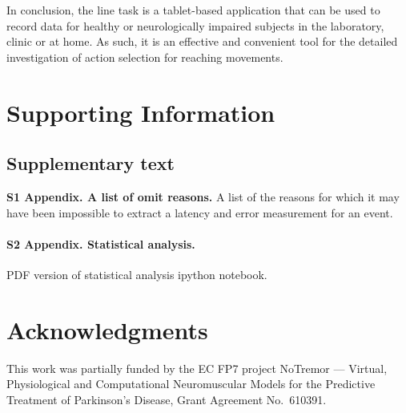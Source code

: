 \documentclass[10pt,letterpaper]{article}
\begin{document}
In conclusion, the line task is a tablet-based application that can be
used to record data for healthy or neurologically impaired subjects in
the laboratory, clinic or at home. As such, it is an effective and
convenient tool for the detailed investigation of action selection for
reaching movements.

\section*{Supporting Information}

\subsection*{Supplementary text}

\label{linetask_omitreasons}
{\bf S1 Appendix. A list of omit reasons.} A list of the reasons for which it may
have been impossible to extract a latency and error measurement for an
event.

\label{linetask_anova}
\paragraph{S2 Appendix. Statistical analysis.} PDF version of statistical analysis
ipython notebook.

\section*{Acknowledgments}

This work was partially funded by the EC FP7 project NoTremor ---
Virtual, Physiological and Computational Neuromuscular Models for the
Predictive Treatment of Parkinson's Disease, Grant Agreement
No.~610391.

\nolinenumbers
\end{document}
